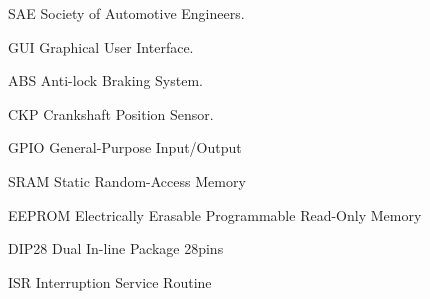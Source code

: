 \begin{siglas}
  \item[SAE] Society of Automotive Engineers.
  \item[GUI] Graphical User Interface.
  \item[ABS] Anti-lock Braking System.
  \item[CKP] Crankshaft Position Sensor.
  \item[GPIO] General-Purpose Input/Output
  \item[SRAM] Static Random-Access Memory
  \item[EEPROM] Electrically Erasable Programmable Read-Only Memory
  \item[DIP28] Dual In-line Package 28pins
  \item[ISR] Interruption Service Routine
\end{siglas}